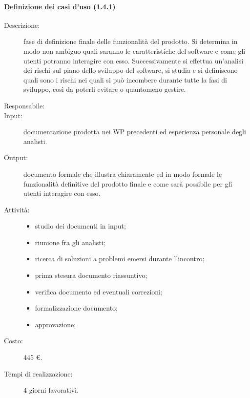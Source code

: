 \paragraph{Definizione dei casi d'uso (1.4.1)}
\begin{description}
\item[Descrizione:]fase di definizione finale delle funzionalit\`{a} del prodotto. Si determina in modo non ambiguo quali saranno le caratteristiche del software e come gli utenti potranno interagire con esso. Successivamente si effettua un'analisi dei rischi sul piano dello sviluppo del software, si studia e si definiscono quali sono i rischi nei quali si pu\`{o} incombere durante tutte la fasi di sviluppo, cos\`{i} da poterli evitare o quantomeno gestire.
\item[Responsabile:] 
\item[Input: ]documentazione prodotta nei WP precedenti ed esperienza personale degli analisti.
\item[Output:] documento formale che illustra chiaramente ed in modo formale le funzionalit\`{a} definitive del prodotto finale e come sar\`{a} possibile per gli utenti interagire con esso.
\item[Attivit\`{a}:] 
\begin{center}
\begin{itemize}
\item studio dei documenti in input;
\item riunione fra gli analisti;
\item ricerca di soluzioni a problemi emersi durante l'incontro;
\item prima stesura documento riassuntivo;
\item verifica documento ed eventuali correzioni;
\item formalizzazione documento;
\item approvazione;
\end{itemize}
\end{center}
\item[Costo:] 445 \euro{}.
\item[Tempi di realizzazione:] 4 giorni lavorativi.
\end{description}

